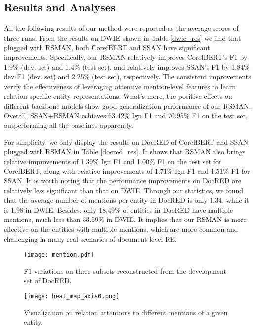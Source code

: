 \documentclass[11pt]{article}
\begin{document}
\subsection{Results and Analyses}\label{res and ana}
All the following results of our method were reported as the average scores of three runs. From the results on DWIE shown in Table \ref{dwie_res} we find that plugged with RSMAN, both CorefBERT and SSAN have significant improvements. Specifically, our RSMAN relatively improves CorefBERT's F1 by 1.9\% (dev. set) and 1.4\% (test set), and relatively improves SSAN's F1 by 1.84\% dev F1 (dev. set) and 2.25\% (test set), respectively. The consistent improvements verify the effectiveness of leveraging attentive mention-level features to learn relation-specific entity representations. What's more, the positive effects on different backbone models show good generalization performance of our RSMAN. Overall, SSAN+RSMAN achieves 63.42\% Ign F1 and 70.95\% F1 on the test set, outperforming all the baselines apparently.

For simplicity, we only display the results on DocRED of CorefBERT and SSAN plugged with RSMAN in Table \ref{docred_res}. It shows that RSMAN also brings relative improvements of 1.39\% Ign F1 and 1.00\% F1 on the test set for CorefBERT, along with relative improvements of 1.71\% Ign F1 and 1.51\% F1 for SSAN. It is worth noting that the performance improvements on DocRED are relatively less significant than that on DWIE. Through our statistics, we found that the average number of mentions per entity in DocRED is only 1.34, while it is 1.98 in DWIE. Besides, only 18.49\% of entities in DocRED have multiple mentions, much less than 33.59\% in DWIE. It implies that our RSMAN is more effective on the entities with multiple mentions, which are more common and challenging in many real scenarios of document-level RE.

\begin{figure}[t]
\centering
\vspace{-0.1cm}
\texttt{[image: mention.pdf]}
    \vspace{-0.2cm}
    \caption{F1 variations on three subsets reconstructed from the development set of DocRED.} \label{relation instance}
    \vspace{-0.2cm}
\end{figure}

\begin{figure}[t]
\centering
    \texttt{[image: heat\_map\_axis0.png]}
    \vspace{-0.5cm}
    \caption{Visualization on relation attentions to different mentions of a given entity.}
    \label{heatmap}
  \vspace{-0.2cm}
\end{figure}
\end{document}
